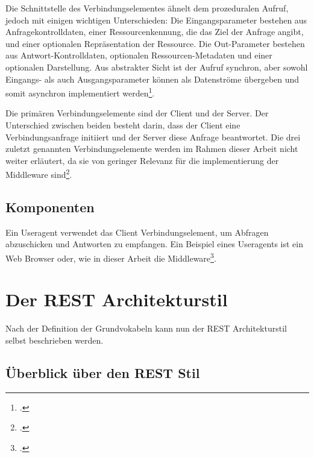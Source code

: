 Die Schnittstelle des Verbindungselementes ähnelt dem prozeduralen Aufruf, jedoch mit einigen wichtigen Unterschieden: Die Eingangsparameter bestehen aus Anfragekontrolldaten, einer Ressourcenkennung, die das Ziel der Anfrage angibt, und einer optionalen Repräsentation der Ressource. Die Out-Parameter bestehen aus Antwort-Kontrolldaten, optionalen Ressourcen-Metadaten und einer optionalen Darstellung. Aus abstrakter Sicht ist der Aufruf synchron, aber sowohl Eingangs- als auch Ausgangsparameter können als Datenströme übergeben und somit asynchron implementiert werden\footcite[Vgl. ][S. 92ff]{fielding_architectural_2000}.

Die primären Verbindungselemente sind der Client und der Server. Der Unterschied zwischen beiden besteht darin, dass der Client eine Verbindungsanfrage initiiert und der Server diese Anfrage beantwortet. Die drei zuletzt genannten Verbindungselemente werden im Rahmen dieser Arbeit nicht weiter erläutert, da sie von geringer Relevanz für die implementierung der Middleware sind\footcite[Vgl. ][S. 92ff]{fielding_architectural_2000}.

\subsection{Komponenten}\label{subsection:komponenten}

Ein Useragent verwendet das Client Verbindungselement, um Abfragen abzuschicken und Antworten zu empfangen. Ein Beispiel eines Useragents ist ein Web Browser oder, wie in dieser Arbeit die Middleware\footcite[Vgl. ][S. 96ff]{fielding_architectural_2000}.

\section{Der REST Architekturstil}\label{subsection:der-rest-architekturstil}

Nach der Definition der Grundvokabeln kann nun der REST Architekturstil selbst beschrieben werden.

\subsection{Überblick über den REST Stil}\label{subsection:ueberblick-ueber-den-rest-stil}

